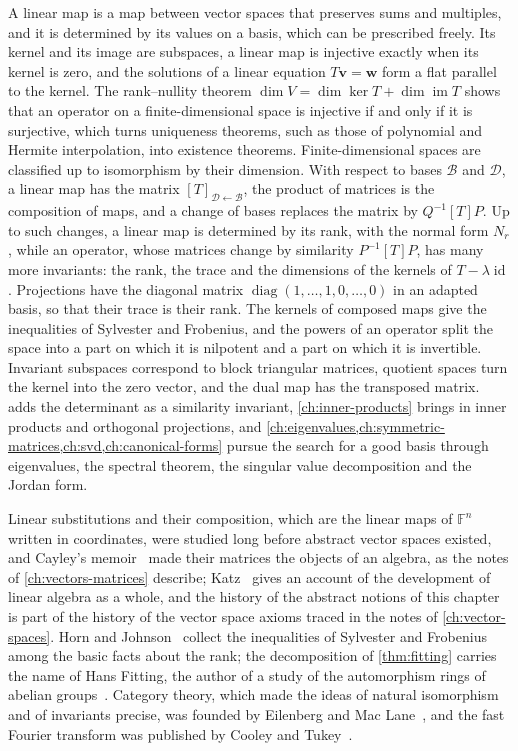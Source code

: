 \bigskip
A linear map is a map between vector spaces that preserves sums and multiples, and it is determined by its values on a basis, which can be prescribed freely. Its kernel and its image are subspaces, a linear map is injective exactly when its kernel is zero, and the solutions of a linear equation $T\mathbf v=\mathbf w$ form a flat parallel to the kernel. The rank--nullity theorem $\dim V=\dim\ker T+\dim\operatorname{im}T$ shows that an operator on a finite-dimensional space is injective if and only if it is surjective, which turns uniqueness theorems, such as those of polynomial and Hermite interpolation, into existence theorems. Finite-dimensional spaces are classified up to isomorphism by their dimension. With respect to bases $\mathcal B$ and $\mathcal D$, a linear map has the matrix $[T]_{\mathcal D\leftarrow\mathcal B}$, the product of matrices is the composition of maps, and a change of bases replaces the matrix by $Q^{-1}[T]P$. Up to such changes, a linear map is determined by its rank, with the normal form $N_r$, while an operator, whose matrices change by similarity $P^{-1}[T]P$, has many more invariants: the rank, the trace and the dimensions of the kernels of $T-\lambda\operatorname{id}$. Projections have the diagonal matrix $\operatorname{diag}(1,\ldots,1,0,\ldots,0)$ in an adapted basis, so that their trace is their rank. The kernels of composed maps give the inequalities of Sylvester and Frobenius, and the powers of an operator split the space into a part on which it is nilpotent and a part on which it is invertible. Invariant subspaces correspond to block triangular matrices, quotient spaces turn the kernel into the zero vector, and the dual map has the transposed matrix.  adds the determinant as a similarity invariant, \cref{ch:inner-products} brings in inner products and orthogonal projections, and \cref{ch:eigenvalues,ch:symmetric-matrices,ch:svd,ch:canonical-forms} pursue the search for a good basis through eigenvalues, the spectral theorem, the singular value decomposition and the Jordan form.

\chapternotes

Linear substitutions and their composition, which are the linear maps of $\mathbb F^n$ written in coordinates, were studied long before abstract vector spaces existed, and Cayley's memoir~\cite{cayley1858} made their matrices the objects of an algebra, as the notes of \cref{ch:vectors-matrices} describe; Katz~\cite{katz2009} gives an account of the development of linear algebra as a whole, and the history of the abstract notions of this chapter is part of the history of the vector space axioms traced in the notes of \cref{ch:vector-spaces}. Horn and Johnson~\cite[Sect.~0.4]{horn2013} collect the inequalities of Sylvester and Frobenius among the basic facts about the rank; the decomposition of \cref{thm:fitting} carries the name of Hans Fitting, the author of a study of the automorphism rings of abelian groups~\cite{fitting1933}. Category theory, which made the ideas of natural isomorphism and of invariants precise, was founded by Eilenberg and Mac Lane~\cite{eilenberg1945,maclane1998}, and the fast Fourier transform was published by Cooley and Tukey~\cite{cooley1965}.

